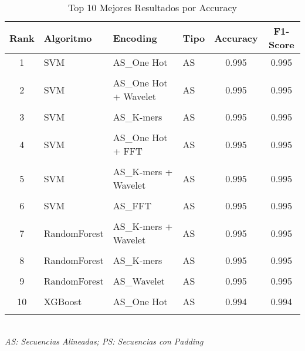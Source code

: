 \begin{table}[htbp]
\centering
\caption{Top 10 Mejores Resultados por Accuracy}
\label{tab:top10_results}
\small
\begin{tabular}{clllcc}
\toprule
\textbf{Rank} & \textbf{Algoritmo} & \textbf{Encoding} & \textbf{Tipo} & \textbf{Accuracy} & \textbf{F1-Score} \\
\midrule
1 & SVM & AS\_One Hot & AS & 0.995 & 0.995 \\\\
2 & SVM & AS\_One Hot + Wavelet & AS & 0.995 & 0.995 \\\\
3 & SVM & AS\_K-mers & AS & 0.995 & 0.995 \\\\
4 & SVM & AS\_One Hot + FFT & AS & 0.995 & 0.995 \\\\
5 & SVM & AS\_K-mers + Wavelet & AS & 0.995 & 0.995 \\\\
6 & SVM & AS\_FFT & AS & 0.995 & 0.995 \\\\
7 & RandomForest & AS\_K-mers + Wavelet & AS & 0.995 & 0.995 \\\\
8 & RandomForest & AS\_K-mers & AS & 0.995 & 0.995 \\\\
9 & RandomForest & AS\_Wavelet & AS & 0.995 & 0.995 \\\\
10 & XGBoost & AS\_One Hot & AS & 0.994 & 0.994 \\\\
\bottomrule
\end{tabular}
\\[0.5em]
\footnotesize
\textit{AS: Secuencias Alineadas; PS: Secuencias con Padding}
\end{table}